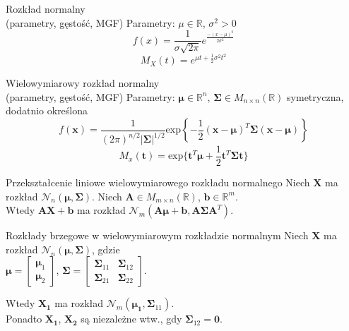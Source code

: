 \documentclass[avery5371, grid, frame]{flashcards}
\begin{document}
\begin{flashcard}[Definicja]{Rozkład normalny \\ (parametry, gęstość, MGF)}
    Parametry: $\mu \in \mathbb{R}$, $\sigma^2 > 0$
    $$ f(x) = \frac{1}{\sigma \sqrt{2\pi}} e^{\frac{-(x-\mu)^2}{2\sigma^2}} $$
    $$ M_X(t) = e^{\mu t + \frac{1}{2}\sigma^2 t^2} $$
\end{flashcard}

\begin{flashcard}[Definicja]{Wielowymiarowy rozkład normalny \\ (parametry, gęstość, MGF)}
    Parametry: $\boldsymbol{\mu} \in \mathbb{R}^n$, $\boldsymbol{\Sigma} \in M_{n \times n}(\mathbb{R})$ symetryczna, dodatnio określona
    $$ f(\mathbf{x}) = \frac{1}{(2\pi)^{n/2} |\boldsymbol{\Sigma}|^{1/2}} \text{exp} \left \{ -\frac{1}{2} (\mathbf{x} - \boldsymbol{\mu})^T \boldsymbol{\Sigma} (\mathbf{x} - \boldsymbol{\mu}) \right \}$$
    $$M_x(\mathbf{t}) = \text{exp}\{ \mathbf{t}^T \boldsymbol{\mu} + \frac{1}{2} \mathbf{t}^T \boldsymbol{\Sigma} \boldsymbol{t}\} $$
\end{flashcard}

\begin{flashcard}[Twierdzenie]{Przekształcenie liniowe wielowymiarowego rozkładu normalnego}
    Niech \textbf{X} ma rozkład $\mathcal{N}_n (\boldsymbol{\mu}, \boldsymbol{\Sigma})$. Niech $\mathbf{A} \in M_{m \times n}(\mathbb{R})$, $\mathbf{b} \in \mathbb{R}^m$. \\
    Wtedy $\mathbf{AX} + \mathbf{b}$ ma rozkład $\mathcal{N}_m(\mathbf{A}\boldsymbol{\mu} + \mathbf{b}, \mathbf{A}\boldsymbol{\Sigma}\mathbf{A}^T)$.
\end{flashcard}

\begin{flashcard}[Twierdzenie]{Rozkłady brzegowe w wielowymiarowym rozkładzie normalnym}
    Niech \textbf{X} ma rozkład $\mathcal{N}_n (\boldsymbol{\mu}, \boldsymbol{\Sigma})$, gdzie \\
    $ \boldsymbol{\mu} =
    \left[ \begin{array}{c}
    \boldsymbol{\mu}_1 \\
    \boldsymbol{\mu}_2 \end{array} \right] $,
    $ \boldsymbol{\Sigma} =
    \left[ \begin{array}{cc}
    \boldsymbol{\Sigma}_{11} & \boldsymbol{\Sigma}_{12}\\
    \boldsymbol{\Sigma}_{21} & \boldsymbol{\Sigma}_{22} \end{array} \right] $. \newline

    Wtedy $\mathbf{X_1}$ ma rozkład $\mathcal{N}_m(\boldsymbol{\mu_1}, \boldsymbol{\Sigma}_{11})$. \\ Ponadto $\mathbf{X_1}$, $\mathbf{X_2}$ są niezależne wtw., gdy $\boldsymbol{\Sigma}_{12} = \mathbf{0}$.
\end{flashcard}
\end{document}
